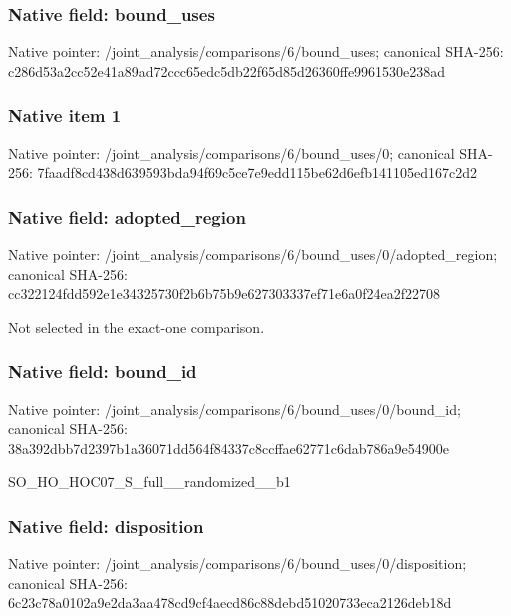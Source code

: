 \documentclass[10pt,a4paper]{article}
\begin{document}
\subsubsection{Native field: bound\_\allowbreak{}uses}
Native pointer: /joint\_\allowbreak{}analysis/comparisons/6/bound\_\allowbreak{}uses; canonical SHA-256: c286d53a2cc52e41a89ad72ccc65edc5db22f65d85d26360ffe9961530e238ad

\subsubsection{Native item 1}
Native pointer: /joint\_\allowbreak{}analysis/comparisons/6/bound\_\allowbreak{}uses/0; canonical SHA-256: 7faadf8cd438d639593bda94f69c5ce7e9edd115be62d6efb141105ed167c2d2

\subsubsection{Native field: adopted\_\allowbreak{}region}
Native pointer: /joint\_\allowbreak{}analysis/comparisons/6/bound\_\allowbreak{}uses/0/adopted\_\allowbreak{}region; canonical SHA-256: cc322124fdd592e1e34325730f2b6b75b9e627303337ef71e6a0f24ea2f22708

\begingroup\raggedright\sloppy Not selected in the exact-one comparison.\par\endgroup

\subsubsection{Native field: bound\_\allowbreak{}id}
Native pointer: /joint\_\allowbreak{}analysis/comparisons/6/bound\_\allowbreak{}uses/0/bound\_\allowbreak{}id; canonical SHA-256: 38a392dbb7d2397b1a36071dd564f84337c8ccffae62771c6dab786a9e54900e

\begingroup\raggedright\sloppy SO\_\allowbreak{}HO\_\allowbreak{}HOC07\_\allowbreak{}S\_\allowbreak{}full\_\allowbreak{}\_\allowbreak{}randomized\_\allowbreak{}\_\allowbreak{}b1\par\endgroup

\subsubsection{Native field: disposition}
Native pointer: /joint\_\allowbreak{}analysis/comparisons/6/bound\_\allowbreak{}uses/0/disposition; canonical SHA-256: 6c23c78a0102a9e2da3aa478cd9cf4aecd86c88debd51020733eca2126deb18d
\end{document}
